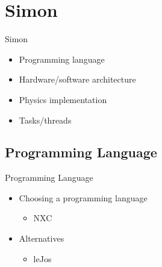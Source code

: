 \section{Simon}
\begin{frame}{Simon}
	\begin{itemize}
	  \item Programming language
	  \item Hardware/software architecture
	  \item Physics implementation
	  \item Tasks/threads
	\end{itemize}
\end{frame}

\subsection{Programming Language}
\begin{frame}{Programming Language}
	\begin{itemize}
	  \item Choosing a programming language
	  \begin{itemize}
	  	\item NXC
	  \end{itemize}
	  \item Alternatives
	  \begin{itemize}
	    \item leJos
	  \end{itemize}
	\end{itemize}
\end{frame}

